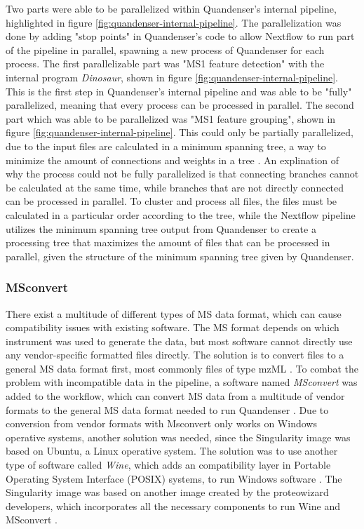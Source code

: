Two parts were able to be parallelized within Quandenser's internal pipeline, highlighted in figure \ref{fig:quandenser-internal-pipeline}. The parallelization was done by adding "stop points" in Quandenser's code to allow Nextflow to run part of the pipeline in parallel, spawning a new process of Quandenser for each process. The first parallelizable part was "MS1 feature detection" with the internal program \textit{Dinosaur}, shown in figure \ref{fig:quandenser-internal-pipeline}. This is the first step in Quandenser's internal pipeline and was able to be "fully" parallelized, meaning that every process can be processed in parallel. The second part which was able to be parallelized was "MS1 feature grouping", shown in figure \ref{fig:quandenser-internal-pipeline}. This could only be partially parallelized, due to the input files are calculated in a minimum spanning tree, a way to minimize the amount of connections and weights in a tree \cite{min-span-tree}. An explination of why the process could not be fully parallelized is that connecting branches cannot be calculated at the same time, while branches that are not directly connected can be processed in parallel. To cluster and process all files, the files must be calculated in a particular order according to the tree, while the Nextflow pipeline utilizes the minimum spanning tree output from Quandenser to create a processing tree that maximizes the amount of files that can be processed in parallel, given the structure of the minimum spanning tree given by Quandenser.

\subsubsection{MSconvert}
There exist a multitude of different types of MS data format, which can cause compatibility issues with existing software. The MS format depends on which instrument was used to generate the data, but most software cannot directly use any vendor-specific formatted files directly. The solution is to convert files to a general MS data format first, most commonly files of type mzML \cite{mzml-format}. To combat the problem with incompatible data in the pipeline, a software named \textit{MSconvert} was added to the workflow, which can convert MS data from a multitude of vendor formats to the general MS data format needed to run Quandenser \cite{proteowizard}. Due to conversion from vendor formats with Msconvert only works on Windows operative systems, another solution was needed, since the Singularity image was based on Ubuntu, a Linux operative system. The solution was to use another type of software called \textit{Wine}, which adds an compatibility layer in Portable Operating System Interface (POSIX) systems, to run Windows software \cite{wine}. The Singularity image was based on another image created by the proteowizard developers, which incorporates all the necessary components to run Wine and MSconvert \cite{docker-image} \cite{docker-howto}.

